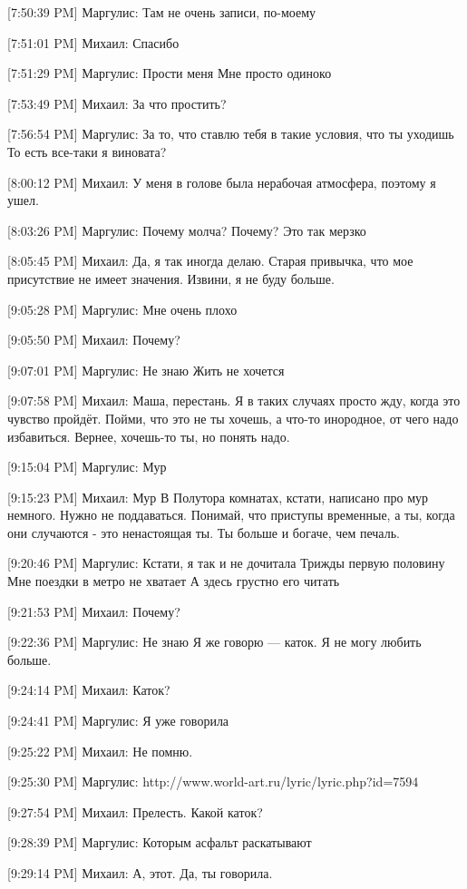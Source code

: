\documentclass{article}
\begin{document}
[7:50:39 PM] Маргулис:
Там не очень записи, по-моему

[7:51:01 PM] Михаил:
Спасибо

[7:51:29 PM] Маргулис:
Прости меня
 Мне просто одиноко

[7:53:49 PM] Михаил:
За что простить?

[7:56:54 PM] Маргулис:
За то, что ставлю тебя в такие условия, что ты уходишь
 То есть все-таки я виновата?

[8:00:12 PM] Михаил:
У меня в голове была нерабочая атмосфера, поэтому я ушел.

[8:03:26 PM] Маргулис:
Почему молча?
 Почему?
 Это так мерзко

[8:05:45 PM] Михаил:
Да, я так иногда делаю. Старая привычка, что мое присутствие не имеет значения. Извини, я не буду больше.

[9:05:28 PM] Маргулис:
Мне очень плохо

[9:05:50 PM] Михаил:
Почему?

[9:07:01 PM] Маргулис:
Не знаю
 Жить не хочется

[9:07:58 PM] Михаил:
Маша, перестань.
 Я в таких случаях просто жду, когда это чувство пройдёт.
 Пойми, что это не ты хочешь, а что-то инородное, от чего надо избавиться.
 Вернее, хочешь-то ты, но понять надо.

[9:15:04 PM] Маргулис:
Мур

[9:15:23 PM] Михаил:
Мур
 В Полутора комнатах, кстати, написано про мур немного.
 Нужно не поддаваться. Понимай, что приступы временные, а ты, когда они случаются - это ненастоящая ты. Ты больше и богаче, чем печаль.

[9:20:46 PM] Маргулис:
Кстати, я так и не дочитала
 Трижды первую половину
 Мне поездки в метро не хватает
 А здесь грустно его читать

[9:21:53 PM] Михаил:
Почему?

[9:22:36 PM] Маргулис:
Не знаю
 Я же говорю — каток. Я не могу любить больше.

[9:24:14 PM] Михаил:
Каток?

[9:24:41 PM] Маргулис:
Я уже говорила

[9:25:22 PM] Михаил:
Не помню.

[9:25:30 PM] Маргулис:
http://www.world-art.ru/lyric/lyric.php?id=7594

[9:27:54 PM] Михаил:
Прелесть.
 Какой каток?

[9:28:39 PM] Маргулис:
Которым асфальт раскатывают

[9:29:14 PM] Михаил:
А, этот. Да, ты говорила.
\end{document}
